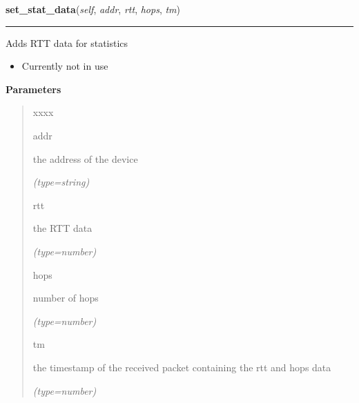 \hspace{.8\funcindent}\begin{boxedminipage}{\funcwidth}

    \raggedright \textbf{set\_stat\_data}(\textit{self}, \textit{addr}, \textit{rtt}, \textit{hops}, \textit{tm})

    \vspace{-1.5ex}

    \rule{\textwidth}{0.5\fboxrule}
\setlength{\parskip}{2ex}
    Adds RTT  data for statistics

    \begin{itemize}
    \setlength{\parskip}{0.6ex}
      \item Currently not in use

    \end{itemize}

\setlength{\parskip}{1ex}
      \textbf{Parameters}
      \vspace{-1ex}

      \begin{quote}
        \begin{Ventry}{xxxx}

          \item[addr]

          the address of the device

            {\it (type=string)}

          \item[rtt]

          the RTT data

            {\it (type=number)}

          \item[hops]

          number of hops

            {\it (type=number)}

          \item[tm]

          the timestamp of the received packet containing the rtt and hops 
          data

            {\it (type=number)}

        \end{Ventry}

      \end{quote}

    \end{boxedminipage}

    \label{DBE:DBE:add_chip}

